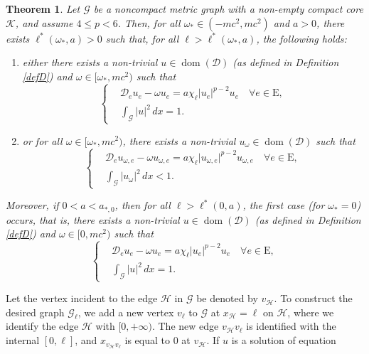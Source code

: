 \documentclass[11pt]{amsart}
\newtheorem{theorem}{Theorem}[section]
\newcommand{\abs}[1]{\lvert#1\rvert}
\newcommand{\D}{\mathcal{D}}
\newcommand{\G}{\mathcal{G}}
\newcommand{\K}{\mathcal{K}}
\numberwithin{equation}{section}
\begin{document}
 \begin{theorem}\label{th4}
    Let $\G$ be a noncompact metric graph with a non-empty compact core $\K$, and assume $4 \leq p <6$. Then, for all $\omega_*\in(-mc^2, mc^2)$ and $a > 0$, there exists $\ell^*(\omega_*,a)>0$ such that, for all $\ell>\ell^*(\omega_*,a)$, the following holds:\\
    \begin{enumerate}[label=\rm(\roman*)]
        \item either there exists a non-trivial $u \in \operatorname{dom}(\D)$ (as defined in Definition \ref{defD}) and $\omega \in [\omega_*, mc^2)$ such that
    \begin{equation*}
    \left\{\begin{aligned}
        &\D_e u_e - \omega u_e= a\chi_\ell\abs{u_e}^{p-2}u_e \quad \forall e\in \mathrm{E},\\
        &\int_\G\abs{u}^2\,dx = 1.
    \end{aligned}
    \right.
\end{equation*}
\item  or for all $\omega \in [\omega_*, mc^2)$, there exists a non-trivial $u_\omega \in \operatorname{dom}(\D)$ such that
    \begin{equation*}
    \left\{\begin{aligned}
        &\D_e u_{\omega,e} - \omega u_{\omega,e} = a\chi_\ell\abs{u_{\omega,e}}^{p-2}u_{\omega,e} \quad\forall e\in \mathrm{E},\\
        &\int_\G\abs{u_\omega}^2\,dx < 1.
    \end{aligned}
    \right.
    \end{equation*}
    \end{enumerate}
Moreover, if $0<a<a_{*,0}$, then for all $\ell>\ell^*(0,a)$, the first case (for $\omega_* =0$) occurs, that is, there exists a non-trivial $u \in \operatorname{dom}(\D)$ (as defined in Definition \ref{defD}) and $\omega \in [0, mc^2)$ such that
    \begin{equation*}
    \left\{\begin{aligned}
        &\D_e u_e - \omega u_e= a\chi_\ell\abs{u_e}^{p-2}u_e \quad \forall e\in \mathrm{E},\\
        &\int_\G\abs{u}^2\,dx = 1.
    \end{aligned}
    \right.
    \end{equation*}
\end{theorem}
Let the vertex incident to the edge $\mathcal{H}$ in $\G$ be denoted by $v_\mathcal{H}$. To construct the desired graph $\G_\ell$, we add  a new vertex $v_\ell$ to $\G$ at $x_{\mathcal{H}} = \ell$ on $\mathcal{H}$, where we  identify the edge $\mathcal{H}$ with $[0,+\infty)$. The new edge $v_\mathcal{H}v_\ell$ is identified with the internal $[0,\ell]$, and $x_{v_\mathcal{H}v_\ell}$ is equal to $0$ at $v_\mathcal{H}$. If $u$ is a solution of equation
\end{document}
